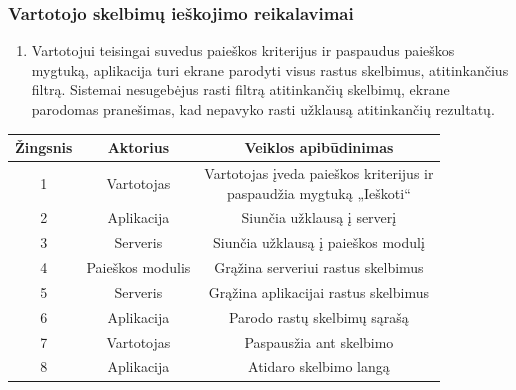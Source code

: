 \documentclass[12pt]{article}
\begin{document}
	\subsubsection{Vartotojo skelbimų ieškojimo reikalavimai}
	\begin{enumerate}[labelindent=10pt,leftmargin=2.2cm]
		\item Vartotojui teisingai suvedus paieškos kriterijus ir paspaudus paieškos mygtuką, aplikacija turi ekrane parodyti visus rastus skelbimus, atitinkančius filtrą. Sistemai nesugebėjus rasti filtrą atitinkančių skelbimų, ekrane parodomas pranešimas, kad nepavyko rasti užklausą atitinkančių rezultatų.
	\end{enumerate}
		
		\begin{center}
		\begin{tabular}{ | c | c | c | }
			\hline
			Žingsnis & Aktorius     & Veiklos apibūdinimas \\ \hline
			1        & Vartotojas   & \makecell{Vartotojas įveda paieškos kriterijus ir \\ paspaudžia mygtuką „Ieškoti“} \\ \hline
			2        & Aplikacija   & Siunčia užklausą į serverį \\ \hline
			3        & Serveris     & Siunčia užklausą į paieškos modulį \\ \hline
			4        & Paieškos modulis & Grąžina serveriui rastus skelbimus \\ \hline
			5        & Serveris     & Grąžina aplikacijai rastus skelbimus  \\ \hline
			6        & Aplikacija   & Parodo rastų skelbimų sąrašą \\ \hline
			7        & Vartotojas   & Paspausžia ant skelbimo \\ \hline
			8        & Aplikacija   & Atidaro skelbimo langą \\ \hline
		\end{tabular}
		\bigskip


\end{center}
\end{document}
